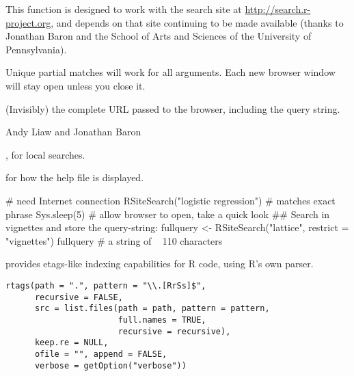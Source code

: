 %
\begin{Details}\relax
This function is designed to work with the search site at
\url{http://search.r-project.org}, and depends on that site
continuing to be made available (thanks to Jonathan Baron and the
School of Arts and Sciences of the University of Pennsylvania).

Unique partial matches will work for all arguments.  Each new
browser window will stay open unless you close it.
\end{Details}
%
\begin{Value}
(Invisibly) the complete URL passed to the browser,
including the query string.
\end{Value}
%
\begin{Author}\relax
Andy Liaw and Jonathan Baron
\end{Author}
%
\begin{SeeAlso}\relax
{},  for local searches.

 for how the help file is displayed.
\end{SeeAlso}
%
\begin{Examples}
\begin{ExampleCode}
# need Internet connection
RSiteSearch("{logistic regression}") # matches exact phrase
Sys.sleep(5) # allow browser to open, take a quick look
## Search in vignettes and store the query-string:
fullquery <- RSiteSearch("lattice", restrict = "vignettes")
fullquery # a string of ~ 110 characters

\end{ExampleCode}
\end{Examples}
%
\begin{Description}\relax
{} provides etags-like indexing capabilities for R code,
using R's own parser.
\end{Description}
%
\begin{Usage}
\begin{verbatim}
rtags(path = ".", pattern = "\\.[RrSs]$",
      recursive = FALSE,
      src = list.files(path = path, pattern = pattern,
                       full.names = TRUE,
                       recursive = recursive),
      keep.re = NULL,
      ofile = "", append = FALSE,
      verbose = getOption("verbose"))
\end{verbatim}
\end{Usage}
